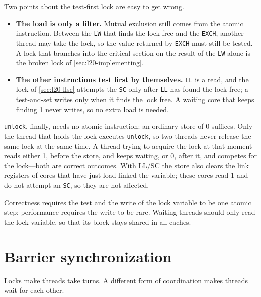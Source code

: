 \documentclass[../main.tex]{subfiles}
\begin{document}
Two points about the test-first lock are easy to get wrong.
\begin{itemize}
  \item \textbf{The load is only a filter.}  Mutual exclusion still comes
    from the atomic instruction.  Between the \texttt{LW} that finds the
    lock free and the \texttt{EXCH}, another thread may take the lock, so
    the value returned by \texttt{EXCH} must still be tested.  A lock that
    branches into the critical section on the result of the \texttt{LW}
    alone is the broken lock of \cref{sec:l20-implementing}.
  \item \textbf{The other instructions test first by themselves.}
    \texttt{LL} is a read, and the lock of \cref{sec:l20-llsc} attempts the
    \texttt{SC} only after \texttt{LL} has found the lock free; a
    test-and-set writes only when it finds the lock free.  A waiting core
    that keeps finding 1 never writes, so no extra load is needed.
\end{itemize}

\texttt{unlock}, finally, needs no atomic instruction: an ordinary store of
0 suffices.  Only the thread that holds the lock executes \texttt{unlock},
so two threads never release the same lock at the same time.  A thread
trying to acquire the lock at that moment reads either 1, before the store,
and keeps waiting, or 0, after it, and competes for the lock---both are
correct outcomes.  With LL/SC the store also clears the link registers of
cores that have just load-linked the variable; these cores read 1 and do not
attempt an \texttt{SC}, so they are not affected.

\begin{keypoint}
  Correctness requires the test and the write of the lock variable to be one
  atomic step; performance requires the write to be rare.  Waiting threads
  should only read the lock variable, so that its block stays shared in all
  caches.
\end{keypoint}

\section{Barrier synchronization}
\label{sec:l20-barrier}

Locks make threads take turns.  A different form of coordination makes threads wait for each
other.
\end{document}
